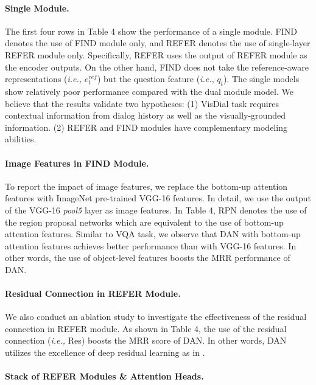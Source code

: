 \documentclass[11pt,a4paper]{article}
\begin{document}
\paragraph{Single Module.}
The first four rows in Table 4 show the performance of a single module. FIND denotes the use of FIND module only, and REFER denotes the use of single-layer REFER module only. Specifically, REFER uses the output of REFER module as the encoder outputs. On the other hand, FIND does not take the reference-aware representations ({\it i.e.,} $e^{ref}_t$) but the question feature ({\it i.e.,} $q_t$). The single models show relatively poor performance compared with the dual module model. We believe that the results validate two hypotheses: (1) VisDial task requires contextual information from dialog history as well as the visually-grounded information. (2) REFER and FIND modules have complementary modeling abilities. 
\paragraph{Image Features in FIND Module.} To report the impact of image features, we replace the bottom-up attention features \cite{Anderson2017up-down} with ImageNet pre-trained VGG-16 \cite{simonyan2014very} features. In detail, we use the output of the VGG-16 {\it pool5} layer as image features. In Table 4, RPN denotes the use of the region proposal networks \cite{ren2015faster} which are equivalent to the use of bottom-up attention features. Similar to VQA task, we observe that DAN with bottom-up attention features achieves better performance than with VGG-16 features. In other words, the use of object-level features boosts the MRR performance of DAN.
\paragraph{Residual Connection in REFER Module.}
We also conduct an ablation study to investigate the effectiveness of the residual connection in REFER module. As shown in Table 4, the use of the residual connection ({\it i.e.,} Res) boosts the MRR score of DAN. In other words, DAN utilizes the excellence of deep residual learning as in \cite{he2016deep, rocktaschel2015reasoning, yang2016stacked, kim2016multimodal,  vaswani2017attention}.  
\paragraph{Stack of REFER Modules \& Attention Heads.} 
\end{document}
